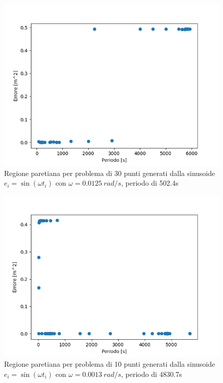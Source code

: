 \documentclass[a4paper,12pt]{report}
\begin{document}
\begin{figure}[H]
  \centering
  \includegraphics[scale=0.67]{img/puls0125/init_30.png}
  \caption{Regione paretiana per problema di 30 punti generati dalla sinusoide \newline $e_i = \sin(\omega t_i)$ con $\omega = 0.0125~rad/s$, periodo di 502.4s}
  \label{fig:init_0125_30}
\end{figure}

\begin{figure}[H]
  \centering
  \includegraphics[scale=0.67]{img/puls0013/init_10.png}
  \caption{Regione paretiana per problema di 10 punti generati dalla sinusoide \newline $e_i = \sin(\omega t_i)$ con $\omega = 0.0013~rad/s$, periodo di 4830.7s}
  \label{fig:init_0013_10}
\end{figure}
\end{document}
